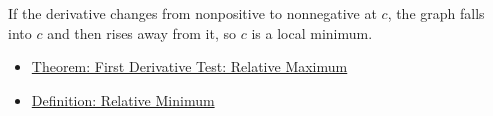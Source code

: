 \begin{remark*}[Interpretation]
If the derivative changes from nonpositive to nonnegative at $c$, the graph falls into $c$ and then rises away from it, so $c$ is a local minimum.
\end{remark*}

\begin{dependencies}
\begin{itemize}
  \item \hyperref[thm:first-derivative-test-maximum]{Theorem: First Derivative Test: Relative Maximum}
  \item \hyperref[def:relative-minimum]{Definition: Relative Minimum}
\end{itemize}
\end{dependencies}
